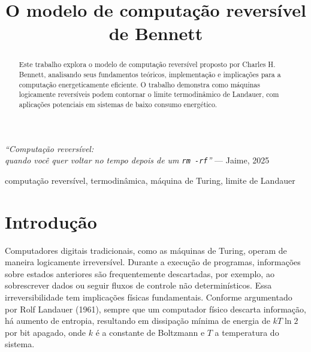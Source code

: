\documentclass[conference]{IEEEtran}
\begin{document}
\title{O modelo de computação reversível de Bennett}

\author{
}

\maketitle

\begin{flushright}
    \textit{``Computação reversível: \\ quando você quer voltar no tempo depois de um \texttt{rm -rf}''}
    \footnotesize — Jaime, 2025
\end{flushright}


\begin{abstract}
Este trabalho explora o modelo de computação reversível proposto por Charles H. Bennett, analisando seus fundamentos teóricos, implementação e implicações para a computação energeticamente eficiente. O trabalho demonstra como máquinas logicamente reversíveis podem contornar o limite termodinâmico de Landauer, com aplicações potenciais em sistemas de baixo consumo energético.
\end{abstract}

\begin{IEEEkeywords}
computação reversível, termodinâmica, máquina de Turing, limite de Landauer
\end{IEEEkeywords}
\section{Introdução}
Computadores digitais tradicionais, como as máquinas de Turing, operam de maneira logicamente irreversível. Durante a execução de programas, informações sobre estados anteriores são frequentemente descartadas, por exemplo, ao sobrescrever dados ou seguir fluxos de controle não determinísticos. Essa irreversibilidade tem implicações físicas fundamentais. Conforme argumentado por Rolf Landauer (1961), sempre que um computador físico descarta informação, há aumento de entropia, resultando em dissipação mínima de energia de $kT\ln2$ por bit apagado, onde $k$ é a constante de Boltzmann e $T$ a temperatura do sistema.
\end{document}
